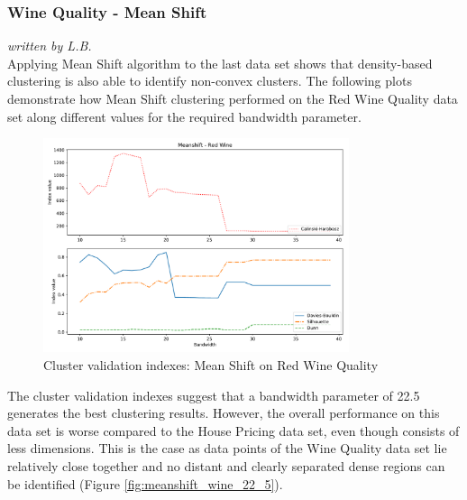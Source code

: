 \subsubsection{Wine Quality - Mean Shift}
\textit{written by L.B.}\\

Applying Mean Shift algorithm to the last data set shows that density-based clustering is also able to identify non-convex clusters. The following plots demonstrate how Mean Shift clustering performed on the Red Wine Quality data set along different values for the required bandwidth parameter.

\begin{figure}[H]
\begin{center}
\includegraphics[width=0.8\textwidth]{images/Meanshift_-_Red_Wine.pdf}
\end{center}
\caption{Cluster validation indexes: Mean Shift on Red Wine Quality}
\label{fig:meanshift_wine_indexes}
\end{figure}

The cluster validation indexes suggest that a bandwidth parameter of 22.5 generates the best clustering results. However, the overall performance on this data set is worse compared to the House Pricing data set, even though consists of less dimensions. This is the case as data points of the Wine Quality data set lie relatively close together and no distant and clearly separated dense regions can be identified (Figure \ref{fig:meanshift_wine_22_5}). 

